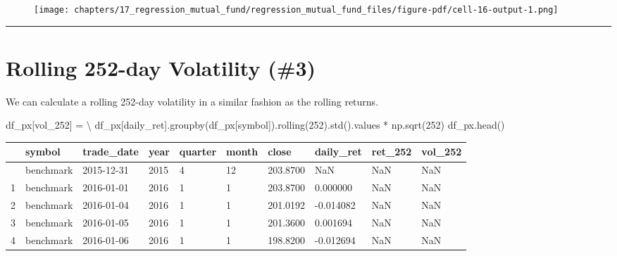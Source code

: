 \documentclass[
  letterpaper,
  DIV=11,
  numbers=noendperiod]{scrreprt}
\newenvironment{Shaded}{\begin{snugshade}}{\end{snugshade}}
\newcommand{\DecValTok}[1]{\textcolor[rgb]{0.68,0.00,0.00}{#1}}
\newcommand{\NormalTok}[1]{\textcolor[rgb]{0.00,0.23,0.31}{#1}}
\newcommand{\OperatorTok}[1]{\textcolor[rgb]{0.37,0.37,0.37}{#1}}
\newcommand{\StringTok}[1]{\textcolor[rgb]{0.13,0.47,0.30}{#1}}
\begin{document}
\begin{figure}[H]

{\centering \texttt{[image: chapters/17\_regression\_mutual\_fund/regression\_mutual\_fund\_files/figure-pdf/cell-16-output-1.png]}

}

\end{figure}

\begin{center}\rule{0.5\linewidth}{0.5pt}\end{center}

\hypertarget{rolling-252-day-volatility-3}{%
\section{Rolling 252-day Volatility
(\#3)}\label{rolling-252-day-volatility-3}}

We can calculate a rolling 252-day volatility in a similar fashion as
the rolling returns.

\begin{Shaded}
\begin{Highlighting}[]
\NormalTok{df\_px[}\StringTok{\textquotesingle{}vol\_252\textquotesingle{}}\NormalTok{] }\OperatorTok{=} \OperatorTok{\textbackslash{}}
\NormalTok{    df\_px[}\StringTok{\textquotesingle{}daily\_ret\textquotesingle{}}\NormalTok{].groupby(df\_px[}\StringTok{\textquotesingle{}symbol\textquotesingle{}}\NormalTok{]).rolling(}\DecValTok{252}\NormalTok{).std().values }\OperatorTok{*}\NormalTok{ np.sqrt(}\DecValTok{252}\NormalTok{)}
\NormalTok{df\_px.head()}
\end{Highlighting}
\end{Shaded}

\begin{longtable}[]{@{}llllllllll@{}}
\toprule\noalign{}
& symbol & trade\_date & year & quarter & month & close & daily\_ret &
ret\_252 & vol\_252 \\
\midrule\noalign{}
\endhead
\bottomrule\noalign{}
\endlastfoot
0 & benchmark & 2015-12-31 & 2015 & 4 & 12 & 203.8700 & NaN & NaN &
NaN \\
1 & benchmark & 2016-01-01 & 2016 & 1 & 1 & 203.8700 & 0.000000 & NaN &
NaN \\
2 & benchmark & 2016-01-04 & 2016 & 1 & 1 & 201.0192 & -0.014082 & NaN &
NaN \\
3 & benchmark & 2016-01-05 & 2016 & 1 & 1 & 201.3600 & 0.001694 & NaN &
NaN \\
4 & benchmark & 2016-01-06 & 2016 & 1 & 1 & 198.8200 & -0.012694 & NaN &
NaN \\
\end{longtable}
\end{document}
